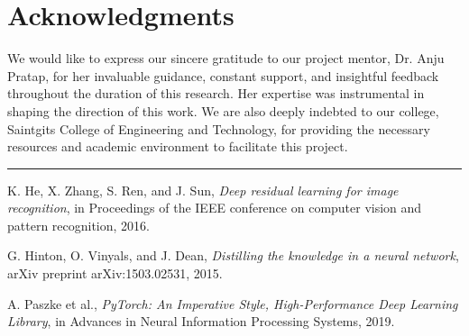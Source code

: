 \documentclass[12pt,a4paper]{article}
\begin{document}
\vspace{1cm}

\section*{Acknowledgments}
We would like to express our sincere gratitude to our project mentor, Dr. Anju Pratap, for her invaluable guidance, constant support, and insightful feedback throughout the duration of this research. Her expertise was instrumental in shaping the direction of this work. We are also deeply indebted to our college, Saintgits College of Engineering and Technology, for providing the necessary resources and academic environment to facilitate this project.

\vspace{2cm}
\hrule
\vspace{0.5cm}
\begin{thebibliography}{9}
    K. He, X. Zhang, S. Ren, and J. Sun,
    \textit{Deep residual learning for image recognition},
    in Proceedings of the IEEE conference on computer vision and pattern recognition, 2016.
    
    G. Hinton, O. Vinyals, and J. Dean,
    \textit{Distilling the knowledge in a neural network},
    arXiv preprint arXiv:1503.02531, 2015.

    A. Paszke et al.,
    \textit{PyTorch: An Imperative Style, High-Performance Deep Learning Library},
    in Advances in Neural Information Processing Systems, 2019.

\end{thebibliography}
\end{document}
